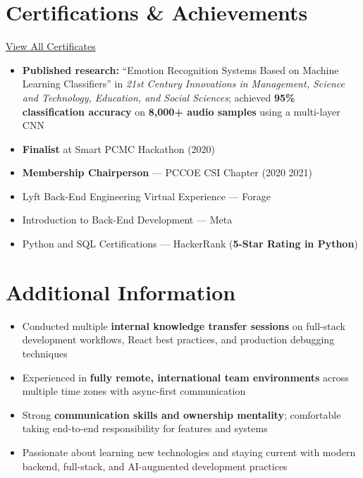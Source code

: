 \documentclass[a4paper,11.5pt]{article}
\newcommand{\h}[1]{\textbf{\textcolor{hgray}{#1}}}
\begin{document}
\vspace{0.4em}

\section*{Certifications \& Achievements}
\href{https://drive.google.com/drive/u/1/folders/1ocAD7_typvgX5pLDh5-g8toVuhYvwl2a}{View All Certificates}
\begin{itemize}[topsep=2pt]
  \item \textbf{Published research:} ``Emotion Recognition Systems Based on Machine Learning Classifiers'' in \textit{21st Century Innovations in Management, Science and Technology, Education, and Social Sciences}; achieved \h{95\% classification accuracy} on \h{8,000+ audio samples} using a multi-layer CNN
  \item \h{Finalist} at Smart PCMC Hackathon (2020)
  \item \h{Membership Chairperson} — PCCOE CSI Chapter (2020 \textendash{} 2021)
  \item Lyft Back-End Engineering Virtual Experience — Forage
  \item Introduction to Back-End Development — Meta
  \item Python and SQL Certifications — HackerRank (\h{5-Star Rating in Python})
\end{itemize}

\vspace{0.4em}

\section*{Additional Information}
\begin{itemize}
  \item Conducted multiple \h{internal knowledge transfer sessions} on full-stack development workflows, React best practices, and production debugging techniques
  \item Experienced in \h{fully remote, international team environments} across multiple time zones with async-first communication
  \item Strong \h{communication skills and ownership mentality}; comfortable taking end-to-end responsibility for features and systems
  \item Passionate about learning new technologies and staying current with modern backend, full-stack, and AI-augmented development practices
\end{itemize}
\end{document}
